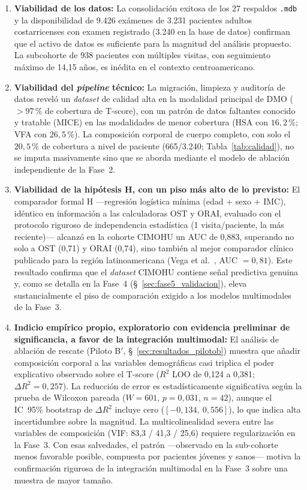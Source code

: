 \documentclass[../tesis.tex]{subfiles}
\begin{document}
\begin{enumerate}
    \item \textbf{Viabilidad de los datos:} La consolidación exitosa de los 27 respaldos \texttt{.mdb} y la disponibilidad de 9.426 exámenes de 3.231 pacientes adultos costarricenses con examen registrado (3.240 en la base de datos) confirman que el activo de datos es suficiente para la magnitud del análisis propuesto. La subcohorte de 938 pacientes con múltiples visitas, con seguimiento máximo de 14{,}15 años, es inédita en el contexto centroamericano.

    \item \textbf{Viabilidad del \textit{pipeline} técnico:} La migración, limpieza y auditoría de datos reveló un \textit{dataset} de calidad alta en la modalidad principal de DMO ($> 97$\,\% de cobertura de T-score), con un patrón de datos faltantes conocido y tratable (MICE) en las modalidades de menor cobertura (HSA con $16{,}2$\,\%; VFA con $26{,}5$\,\%). La composición corporal de cuerpo completo, con solo el $20{,}5$\,\% de cobertura a nivel de paciente (665/3.240; Tabla~\ref{tab:calidad}), no se imputa masivamente sino que se aborda mediante el modelo de ablación independiente de la Fase~2.

    \item \textbf{Viabilidad de la hipótesis H, con un piso más alto de lo previsto:} El comparador formal H ---regresión logística mínima (edad + sexo + IMC), idéntico en información a las calculadoras OST y ORAI, evaluado con el protocolo riguroso de independencia estadística (1 visita/paciente, la más reciente)--- alcanzó en la cohorte CIMOHU un AUC de 0{,}883, superando no solo a OST (0{,}71) y ORAI (0{,}74), sino también al mejor comparador clínico publicado para la región latinoamericana (Vega et al.\ \parencite{Vega2024}, AUC $= 0{,}81$). Este resultado confirma que el \textit{dataset} CIMOHU contiene señal predictiva genuina y, como se detalla en la Fase~4 (§~\ref{sec:fase5_validacion}), eleva sustancialmente el piso de comparación exigido a los modelos multimodales de la Fase~3.

    \item \textbf{Indicio empírico propio, exploratorio con evidencia preliminar de significancia, a favor de la integración multimodal:} El análisis de ablación de rescate (Piloto B$'$, §~\ref{sec:resultados_pilotob}) muestra que añadir composición corporal a las variables demográficas casi triplica el poder explicativo observado sobre el T-score ($R^2$ LOO de 0{,}124 a 0{,}381; $\Delta R^2 = 0{,}257$). La reducción de error es estadísticamente significativa según la prueba de Wilcoxon pareada ($W = 601$, $p = 0{,}031$, $n=42$), aunque el IC~95\% bootstrap de $\Delta R^2$ incluye cero ($[-0{,}134,\ 0{,}556]$), lo que indica alta incertidumbre sobre la magnitud. La multicolinealidad severa entre las variables de composición (VIF: 83,3 / 41,3 / 25,6) requiere regularización en la Fase~3. Con esas salvedades, el patrón ---observado en la sub-cohorte menos favorable posible, compuesta por pacientes jóvenes y sanos--- motiva la confirmación rigurosa de la integración multimodal en la Fase~3 sobre una muestra de mayor tamaño.
\end{enumerate}
\end{document}
